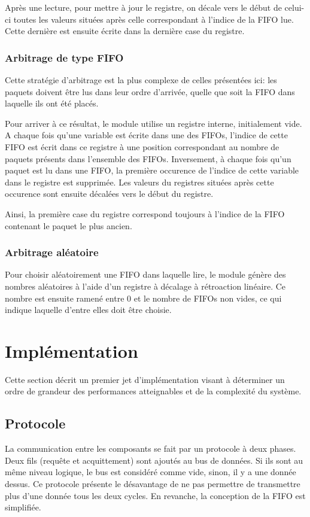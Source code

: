 \documentclass[11pt]{article}
\begin{document}
Après une lecture, pour mettre à jour le registre, on décale vers le début de celui-ci toutes les valeurs
situées après celle correspondant à l'indice de la FIFO lue.
Cette dernière est ensuite écrite dans la dernière case du registre.

\subsubsection{Arbitrage de type FIFO}
Cette stratégie d'arbitrage est la plus complexe de celles présentées ici:
les paquets doivent être lus dans leur ordre d'arrivée, quelle que soit
la FIFO dans laquelle ils ont été placés.

Pour arriver à ce résultat, le module utilise un registre interne, initialement vide.
A chaque fois qu'une variable est écrite dans une des FIFOs, l'indice de cette FIFO est écrit dans ce registre
à une position correspondant au nombre de paquets présents dans l'ensemble des FIFOs.
Inversement, à chaque fois qu'un paquet est lu dans une FIFO, la première occurence de l'indice de cette
variable dans le registre est supprimée. Les valeurs du registres situées après cette occurence sont ensuite décalées vers le début du registre.

Ainsi, la première case du registre correspond toujours à l'indice de la FIFO contenant le paquet le plus ancien.

\subsubsection{Arbitrage aléatoire}
Pour choisir aléatoirement une FIFO dans laquelle lire, le module génère des nombres aléatoires
à l'aide d'un registre à décalage à rétroaction linéaire.
Ce nombre est ensuite ramené entre 0 et le nombre de FIFOs non vides, ce qui indique laquelle d'entre elles doit être choisie.

\section{Implémentation}

Cette section décrit un premier jet d'implémentation visant à déterminer un ordre de grandeur des performances atteignables et de la complexité du système.

\subsection{Protocole}
La communication entre les composants se fait par un protocole à deux phases. Deux fils (requête et acquittement) sont ajoutés au bus de données. Si ils sont au même niveau logique, le bus est considéré comme vide, sinon, il y a une donnée dessus. Ce protocole présente le désavantage de ne pas permettre de transmettre plus d'une donnée tous les deux cycles. En revanche, la conception de la FIFO est simplifiée.	
\end{document}
